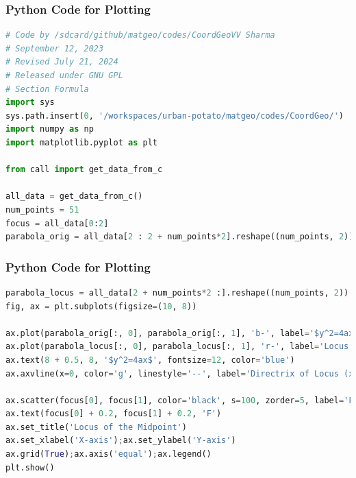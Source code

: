 \documentclass{beamer}
\theoremstyle{remark}
\numberwithin{equation}{section}
\begin{document}
\begin{frame}[fragile]
\frametitle{Python Code for Plotting}
\begin{lstlisting}[language=Python]
# Code by /sdcard/github/matgeo/codes/CoordGeoVV Sharma
# September 12, 2023
# Revised July 21, 2024
# Released under GNU GPL
# Section Formula
import sys
sys.path.insert(0, '/workspaces/urban-potato/matgeo/codes/CoordGeo/') 
import numpy as np
import matplotlib.pyplot as plt

from call import get_data_from_c

all_data = get_data_from_c()
num_points = 51
focus = all_data[0:2]
parabola_orig = all_data[2 : 2 + num_points*2].reshape((num_points, 2))


\end{lstlisting}
\end{frame}
\begin{frame}[fragile]
\frametitle{Python Code for Plotting}
\begin{lstlisting}[language=Python]
parabola_locus = all_data[2 + num_points*2 :].reshape((num_points, 2))
fig, ax = plt.subplots(figsize=(10, 8))

ax.plot(parabola_orig[:, 0], parabola_orig[:, 1], 'b-', label='$y^2=4ax$')
ax.plot(parabola_locus[:, 0], parabola_locus[:, 1], 'r-', label='Locus Parabola')
ax.text(8 + 0.5, 8, '$y^2=4ax$', fontsize=12, color='blue')
ax.axvline(x=0, color='g', linestyle='--', label='Directrix of Locus (x=0)')

ax.scatter(focus[0], focus[1], color='black', s=100, zorder=5, label='Focus')
ax.text(focus[0] + 0.2, focus[1] + 0.2, 'F')
ax.set_title('Locus of the Midpoint')
ax.set_xlabel('X-axis');ax.set_ylabel('Y-axis')
ax.grid(True);ax.axis('equal');ax.legend()
plt.show()

\end{lstlisting}
\end{frame}
\end{document}
